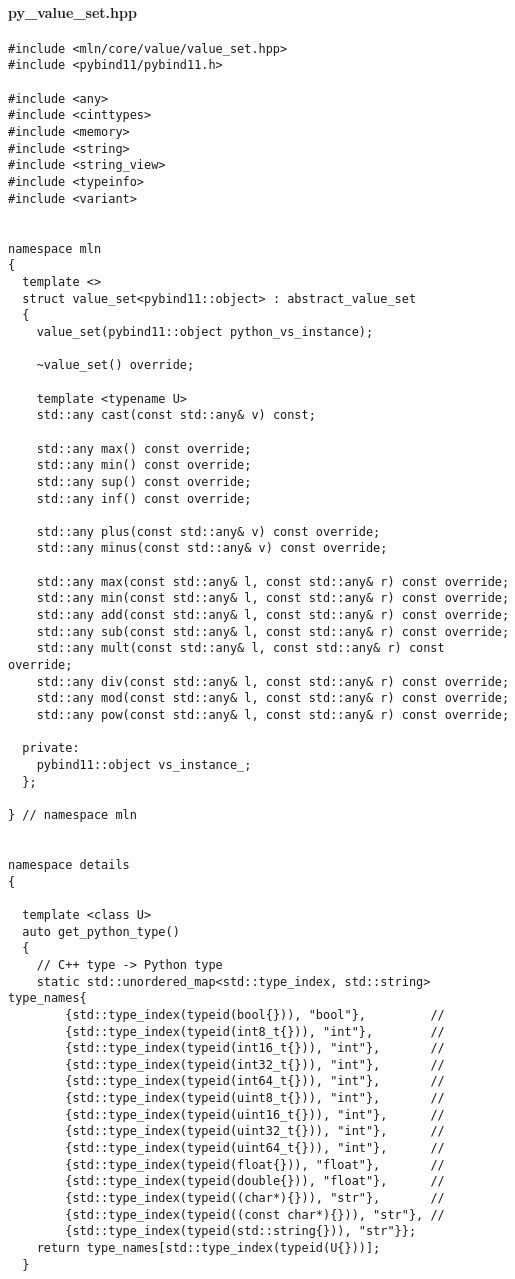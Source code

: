 \paragraph{py\_value\_set.hpp}
\label{appendix:static-dynamic-bridge.mm.vs.py_value_set.hpp}

\begin{verbatim}
#include <mln/core/value/value_set.hpp>
#include <pybind11/pybind11.h>

#include <any>
#include <cinttypes>
#include <memory>
#include <string>
#include <string_view>
#include <typeinfo>
#include <variant>


namespace mln
{
  template <>
  struct value_set<pybind11::object> : abstract_value_set
  {
    value_set(pybind11::object python_vs_instance);

    ~value_set() override;

    template <typename U>
    std::any cast(const std::any& v) const;

    std::any max() const override;
    std::any min() const override;
    std::any sup() const override;
    std::any inf() const override;

    std::any plus(const std::any& v) const override;
    std::any minus(const std::any& v) const override;

    std::any max(const std::any& l, const std::any& r) const override;
    std::any min(const std::any& l, const std::any& r) const override;
    std::any add(const std::any& l, const std::any& r) const override;
    std::any sub(const std::any& l, const std::any& r) const override;
    std::any mult(const std::any& l, const std::any& r) const override;
    std::any div(const std::any& l, const std::any& r) const override;
    std::any mod(const std::any& l, const std::any& r) const override;
    std::any pow(const std::any& l, const std::any& r) const override;

  private:
    pybind11::object vs_instance_;
  };

} // namespace mln


namespace details
{

  template <class U>
  auto get_python_type()
  {
    // C++ type -> Python type
    static std::unordered_map<std::type_index, std::string> type_names{
        {std::type_index(typeid(bool{})), "bool"},         //
        {std::type_index(typeid(int8_t{})), "int"},        //
        {std::type_index(typeid(int16_t{})), "int"},       //
        {std::type_index(typeid(int32_t{})), "int"},       //
        {std::type_index(typeid(int64_t{})), "int"},       //
        {std::type_index(typeid(uint8_t{})), "int"},       //
        {std::type_index(typeid(uint16_t{})), "int"},      //
        {std::type_index(typeid(uint32_t{})), "int"},      //
        {std::type_index(typeid(uint64_t{})), "int"},      //
        {std::type_index(typeid(float{})), "float"},       //
        {std::type_index(typeid(double{})), "float"},      //
        {std::type_index(typeid((char*){})), "str"},       //
        {std::type_index(typeid((const char*){})), "str"}, //
        {std::type_index(typeid(std::string{})), "str"}};
    return type_names[std::type_index(typeid(U{}))];
  }


\end{verbatim}
